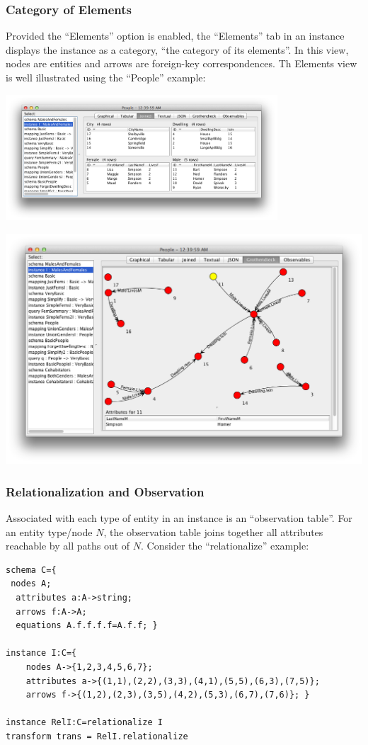 \documentclass[12pt]{article}
\begin{document}
\subsubsection{Category of Elements}

Provided the ``Elements'' option is enabled, the ``Elements'' tab in an instance displays the instance as a category, ``the category of its elements''.  In this view, nodes are entities and arrows are foreign-key correspondences. Th Elements view is well illustrated using the ``People'' example:

\begin{center}
\includegraphics[width=4in]{people}
\end{center}

\begin{center}
\includegraphics[width=6in]{elements}
\end{center}

\subsubsection{Relationalization and Observation}

Associated with each type of entity in an instance is an ``observation table''.  For an entity type/node $N$, the observation table joins together all attributes reachable by all paths out of $N$.  Consider the ``relationalize'' example:
\begin{verbatim}
schema C={
 nodes A;
  attributes a:A->string;
  arrows f:A->A;
  equations A.f.f.f.f=A.f.f; }

instance I:C={
	nodes A->{1,2,3,4,5,6,7};
	attributes a->{(1,1),(2,2),(3,3),(4,1),(5,5),(6,3),(7,5)};
	arrows f->{(1,2),(2,3),(3,5),(4,2),(5,3),(6,7),(7,6)}; }

instance RelI:C=relationalize I
transform trans = RelI.relationalize
\end{verbatim}
\end{document}
